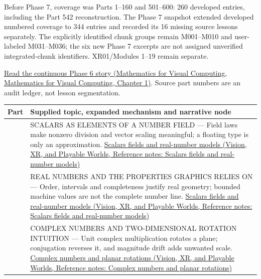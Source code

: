 Before Phase 7, coverage was Parts 1--160 and 501--600: 260 developed entries, including the Part 542 reconstruction. The Phase 7 snapshot extended developed numbered coverage to 344 entries and recorded its 16 missing source lessons separately. The explicitly identified chunk groups remain M001--M010 and user-labeled M031--M036; the six new Phase 7 excerpts are not assigned unverified integrated-chunk identifiers. XR01/Modules 1--19 remain separate.

\href{../02-Mathematics-for-Visual-Computing/main.pdf\#nameddest=01-foundations-i-ch017-the-panel-gives-us-a-reason-to-learn}{Read the continuous Phase 6 story (Mathematics for Visual Computing, Mathematics for Visual Computing, Chapter 1)}. Source part numbers are an audit ledger, not lesson segmentation.

{\def\LTcaptype{none} %
\begin{longtable}[]{@{}
  >{\raggedright\arraybackslash}p{}
  >{\raggedright\arraybackslash}p{}@{}}
\toprule\noalign{}
\begin{minipage}[b]{\linewidth}\raggedright
Part
\end{minipage} & \begin{minipage}[b]{\linewidth}\raggedright
Supplied topic, expanded mechanism and narrative node
\end{minipage} \\
\midrule\noalign{}
\endhead
\bottomrule\noalign{}
\endlastfoot
501 & SCALARS AS ELEMENTS OF A NUMBER FIELD --- Field laws make nonzero division and vector scaling meaningful; a floating type is only an approximation. \href{../07-Vision-XR-and-Playable-Worlds/main.pdf\#nameddest=appendix-52051ad550fe}{Scalars fields and real-number models (Vision, XR, and Playable Worlds, Reference notes: Scalars fields and real-number models)} \\
502 & REAL NUMBERS AND THE PROPERTIES GRAPHICS RELIES ON --- Order, intervals and completeness justify real geometry; bounded machine values are not the complete number line. \href{../07-Vision-XR-and-Playable-Worlds/main.pdf\#nameddest=appendix-52051ad550fe}{Scalars fields and real-number models (Vision, XR, and Playable Worlds, Reference notes: Scalars fields and real-number models)} \\
503 & COMPLEX NUMBERS AND TWO-DIMENSIONAL ROTATION INTUITION --- Unit complex multiplication rotates a plane; conjugation reverses it, and magnitude drift adds unwanted scale. \href{../07-Vision-XR-and-Playable-Worlds/main.pdf\#nameddest=appendix-f77eadcc4a93}{Complex numbers and planar rotations (Vision, XR, and Playable Worlds, Reference notes: Complex numbers and planar rotations)} \\

\end{longtable}}
